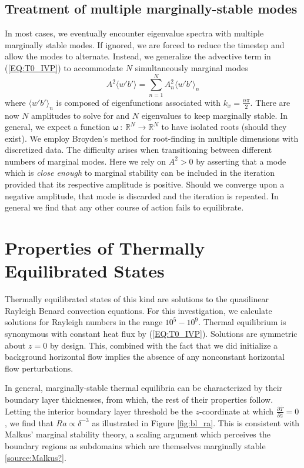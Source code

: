 \documentclass[twocolumn,showpacs,amsmath,amssymb]{revtex4}
\def\bar{\overline}
\begin{document}
\subsection{Treatment of multiple marginally-stable modes} \label{sec:multiple_modes}
In most cases, we eventually encounter eigenvalue spectra with multiple marginally stable modes. If ignored, we are forced to reduce the timestep and allow the modes to alternate. Instead, we generalize the advective term in (\ref{EQ:T0_IVP}) to accommodate $N$ simultaneously marginal modes
\begin{equation}
    A^2 \langle w' b' \rangle = \sum_{n = 1}^{N} A^2_{n} \langle w' b' \rangle_{n}
\end{equation}
where  $\langle w' b' \rangle_{n}$ is composed of eigenfunctions associated with $k_x = \frac{n\pi}{2}$. There are now $N$ amplitudes to solve for and $N$ eigenvalues to keep marginally stable. In general, we expect a function $\mathbf{\omega} \, : \, \mathbb{R}^N \to  \mathbb{R}^N$ to have isolated roots (should they exist). We employ Broyden's method for root-finding in multiple dimensions with discretized data. The difficulty arises when transitioning between different numbers of marginal modes. Here we rely on $A^2 > 0$ by asserting that a mode which is \textit{close enough} to marginal stability can be included in the iteration provided that its respective amplitude is positive. Should we converge upon a negative amplitude, that mode is discarded and the iteration is repeated. In general we find that any other course of action fails to equilibrate.
\newline
\section{Properties of Thermally Equilibrated States}\label{sec:properties}
Thermally equilibrated states of this kind are solutions to the quasilinear Rayleigh Benard convection equations. For this investigation, we calculate solutions for Rayleigh numbers in the range $10^5 - 10^9$. Thermal equilibrium is synonymous with constant heat flux by (\ref{EQ:T0_IVP}). Solutions are symmetric about $z = 0$ by design. This, combined with the fact that we did initialize a background horizontal flow implies the absence of any nonconstant horizontal flow perturbations. 
\par In general, marginally-stable thermal equilibria can be characterized by their boundary layer thicknesses, from which, the rest of their properties follow. Letting the interior boundary layer threshold be the $z$-coordinate at which $\frac{\partial \bar{T}}{\partial z} = 0$, we find that $Ra \propto  \delta^{-3}$ as illustrated in Figure \ref{fig:bl_ra}. This is consistent with Malkus' marginal stability theory, a scaling argument which perceives the boundary regions as subdomains which are themselves marginally stable \ref{source:Malkus?}.
\end{document}
